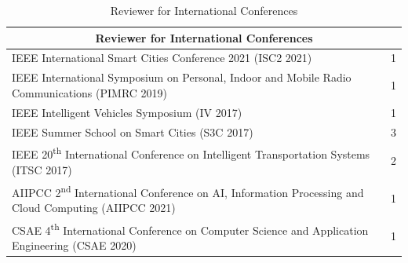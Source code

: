 \documentclass[10pt, a4paper]{article}
\begin{document}
\begin{table}[!htbp]
\small
    \centering
    \renewcommand{\arraystretch}{1.2}
    \begin{tabular}{p{13cm} c}

        \hline
        \multicolumn{2}{c}{\textbf{Reviewer for International Conferences}} \\
        \hline
        IEEE International Smart Cities Conference 2021 (ISC2 2021) & 1  \\
        IEEE International Symposium on Personal, Indoor and Mobile Radio Communications (PIMRC 2019) & 1  \\
        IEEE Intelligent Vehicles Symposium (IV 2017) & 1  \\
        IEEE Summer School on Smart Cities (S3C 2017) & 3 \\
        IEEE 20\textsuperscript{th} International Conference on Intelligent Transportation Systems (ITSC 2017) & 2\\
        AIIPCC 2\textsuperscript{nd} International Conference on AI, Information Processing and Cloud Computing (AIIPCC 2021) & 1  \\
        CSAE 4\textsuperscript{th} International Conference on Computer Science and Application Engineering (CSAE 2020) & 1  \\
         \hline
    \end{tabular}
    \caption{Reviewer for International Conferences}
\end{table}
\end{document}
